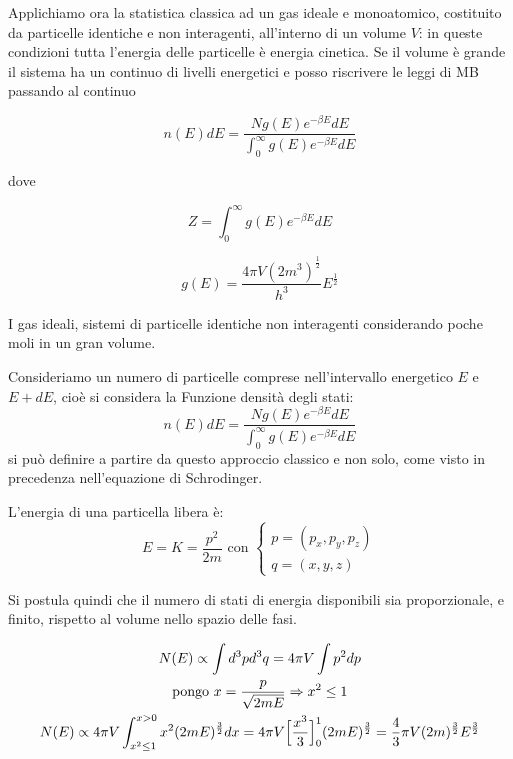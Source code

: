 Applichiamo ora la statistica classica ad un gas ideale e monoatomico, costituito da particelle identiche e non interagenti, all'interno di un volume $V$:
in queste condizioni tutta l'energia delle particelle è energia cinetica.
Se il volume è grande il sistema ha un continuo di livelli energetici e posso riscrivere le leggi di MB passando al continuo

\begin{equation}
n(E)dE = \frac{N g(E) e^{-\beta E} dE}{\int_0^\infty g(E) e^{-\beta E} dE }
\label{numero_particelle}
\end{equation}

dove

\begin{equation}
Z = \int_0^{\infty} g(E) e^{ -\beta E } dE
\end{equation}

\begin{equation}
g(E) = \frac{4 \pi V (2m^3)^{ \frac{1}{2} }}{h^3} E^{ \frac{1}{2} }
\end{equation}





\newpage

I gas ideali, sistemi di particelle identiche non interagenti considerando poche moli in un gran volume.

Consideriamo un numero di particelle comprese nell'intervallo energetico $E$ e $E+dE$, cioè si considera la Funzione densità degli stati:
$$ n(E)dE = \frac{N g(E) e^{-\beta E} dE}{\int_0^\infty g(E) e^{-\beta E} dE } $$
si può definire a partire da questo approccio classico e non solo, come visto in precedenza nell'equazione di Schrodinger.

L'energia di una particella libera è:
\begin{equation}
E = K = \frac{p^2}{2m}
\mbox{ con }
\begin{cases}
p = (p_x, p_y, p_z) \\
q = (x, y, z)
\end{cases}
\end{equation}

Si postula quindi che il numero di stati di energia disponibili sia proporzionale, e finito, rispetto al volume nello spazio delle fasi.

\begin{gather*} 
 N(E) \propto \int d^3 p d^3 q = 4 \pi V \int p^2 dp \\
\mbox{pongo }  x = \frac{p}{\sqrt{2 m E}} \Rightarrow x^2 \leq 1 \\
N(E) \propto 4 \pi V \int_{x^2 \le 1}^{x > 0} x^2 (2mE)^{\frac{3}{2}} dx = 4 \pi V \Bigl[ \frac{x^3}{3}  \Bigr]_0^1 (2mE)^{\frac{3}{2}} = \frac{4}{3} \pi V (2m)^{\frac{3}{2}} E^{\frac{3}{2}}
\end{gather*}

